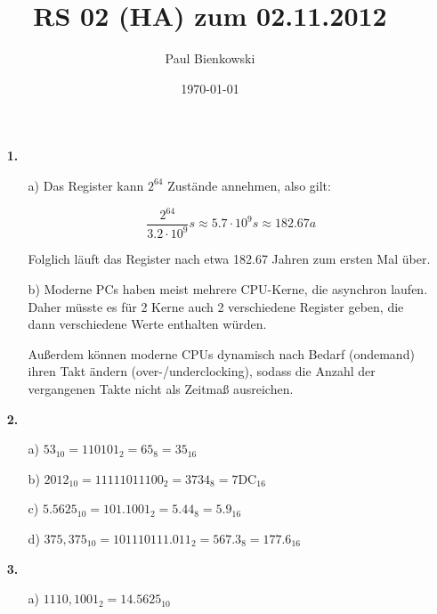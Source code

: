 \documentclass[a4paper,10pt]{scrartcl}
\author{Paul Bienkowski}
\title{RS 02 (HA) zum 02.11.2012}
\date{\today}
\begin{document}
\setcounter{secnumdepth}{0}
\maketitle

\begin{enumerate}
    \item[\textbf{1.}]
        \begin{enumerate}
            \item[a)]
                Das Register kann $2^{64}$ Zustände annehmen, also gilt:

                $$\frac{2^{64}}{3.2 \cdot 10^9} s \approx 5.7 \cdot 10^9 s \approx 182.67 a$$

                Folglich läuft das Register nach etwa 182.67 Jahren zum ersten Mal über.

            \item[b)]
                Moderne PCs haben meist mehrere CPU-Kerne, die asynchron laufen. Daher müsste es für 2 Kerne auch 2 verschiedene Register
                geben, die dann verschiedene Werte enthalten würden.

                Außerdem können moderne CPUs dynamisch nach Bedarf (ondemand) ihren Takt ändern (over-/underclocking), sodass die Anzahl der
                vergangenen Takte nicht als Zeitmaß ausreichen.
        \end{enumerate}

    \item[\textbf{2.}]
        \begin{enumerate}
            \item[a)]
                $53_{10} = 110101_2 = 65_8 = 35_{16}$

            \item[b)]
                $2012_{10} = 11111011100_2 = 3734_8 = \text{7DC}_{16}$

            \item[c)]
                $5.5625_{10} = 101.1001_2 = 5.44_8 = 5.9_{16}$

            \item[d)]
                $375,375_{10} = 101110111.011_2 = 567.3_8 = 177.6_{16}$
        \end{enumerate}

    \item[\textbf{3.}]
        \begin{enumerate}
            \item[a)]
                $1110,1001_2 = 14.5625_{10}$


\end{enumerate}
\end{enumerate}
\end{document}
